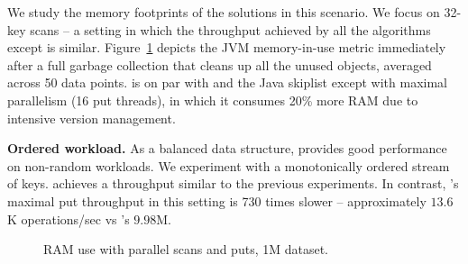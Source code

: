 We study the memory footprints of the solutions in this scenario. We focus on 32-key scans -- a setting 
in which the throughput achieved by all the algorithms except {\snaptree} is similar.  
Figure~\ref{evaluation:results:mem} depicts the JVM memory-in-use metric immediately after a full 
garbage collection that cleans up all the unused objects, averaged across 50 data points. 
{\kiwi} is on par with {\kary} and the Java skiplist except with maximal parallelism (16 put threads), 
in which it consumes 20\% more RAM due to intensive version management.  



\textbf{Ordered workload.} 
As a balanced data structure, {\kiwi} provides good performance on non-random workloads. 
We experiment with a monotonically ordered stream of keys. {\kiwi} achieves a throughput 
similar to the previous experiments. In contrast, {\kary}'s maximal put throughput in this setting is 
730 times slower -- approximately $13.6$K operations/sec vs {\kiwi}'s $9.98$M. 


\begin{figure}
\begin{center}

\end{center}
\caption{RAM use with parallel scans and puts, 1M dataset. }
\label{evaluation:results:mem}
\end{figure}
